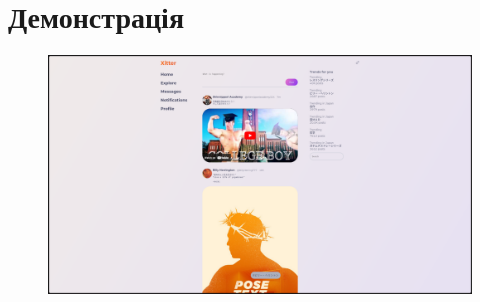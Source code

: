 \section{Демонстрація}

\begin{figure}[!ht]
    \centering
    \includegraphics[height=\textheight,keepaspectratio,width=\textwidth]{../assets/image_2024-11-25_23-19-58.png}
\end{figure}

